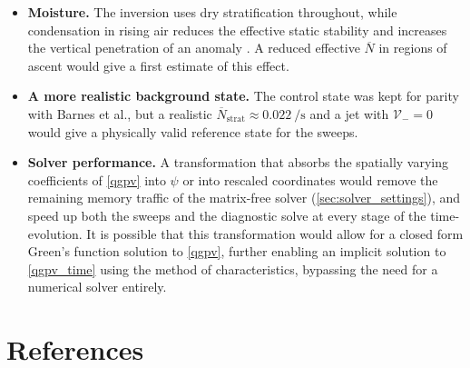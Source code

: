 \documentclass{article}
\begin{document}
\begin{itemize}
    \item \textbf{Moisture.}
    The inversion uses dry stratification throughout, while condensation in rising air reduces the effective static stability and increases the vertical penetration of an anomaly \cite{Hoskins1985}.
    A reduced effective $\overline N$ in regions of ascent would give a first estimate of this effect.

    \item \textbf{A more realistic background state.}
    The control state was kept for parity with Barnes et al., but a realistic $\overline N_\text{strat} \approx \qty{0.022}{\per\second}$ \cite{Grise2010} and a jet with $\mathcal{V}_- = 0$ would give a physically valid reference state for the sweeps.

    \item \textbf{Solver performance.}
    A transformation that absorbs the spatially varying coefficients of \cref{qgpv} into $\psi$ or into rescaled coordinates would remove the remaining memory traffic of the matrix-free solver (\cref{sec:solver_settings}), and speed up both the sweeps and the diagnostic solve at every stage of the time-evolution.
    It is possible that this transformation would allow for a closed form Green's function solution to \cref{qgpv}, further enabling an implicit solution to \cref{qgpv_time} using the method of characteristics, bypassing the need for a numerical solver entirely.
\end{itemize}

\section{References}
\printbibliography[heading=none]
\end{document}

